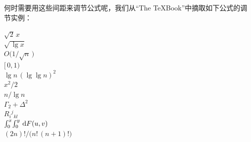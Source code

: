 何时需要用这些间距来调节公式呢，我们从``The \TeX Book''中摘取如下公式的调节实例：

\begin{example}
$\sqrt{2}\,x$\\
$\sqrt{\,\lg x}$\\
$O\bigl(1/\sqrt{n}\,\bigr)$\\
$[\,0,1)$\\
$\lg n\,(\lg\lg n)^2$\\
$x^2\!/2$\\
$n/\!\lg n$\\
$\Gamma_{\!2}+\Delta^{\!2}$\\
$R_i{}^j{}_{\!kl}$\\
$\int_0^x\!\int_0^y\, {\rm d} F(u,v)$\\
$(2n)!/\bigl(n!\,(n+1)!\bigr)$
\end{example}


